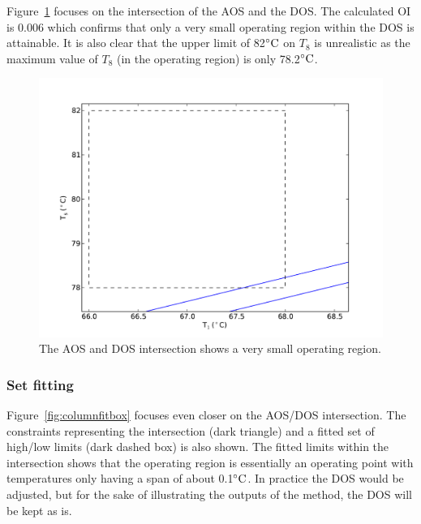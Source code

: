 Figure~\ref{fig:columnaosfocus} focuses on the intersection of the AOS and the DOS.
The calculated OI is 0.006 which confirms that only a very small operating region within the DOS is attainable.
It is also clear that the upper limit of 82$^{\circ}\text{{C}}$ on $T_8$ is unrealistic as the maximum value of $T_8$ (in the operating region) is only 78.2$^{\circ}\text{{C}}$.

\begin{figure}[htbp]
  \centering
    \includegraphics[width=\fullwidth]{graph/columnaosfocus.pdf}
  \caption[AOS and DOS intersection of the laboratory distillation column]{The AOS and DOS intersection shows a very small operating region.}
  \label{fig:columnaosfocus}
\end{figure}

\subsubsection{Set fitting}
Figure~\ref{fig:columnfitbox} focuses even closer on the AOS/DOS intersection.
The constraints representing the intersection (dark triangle) and a fitted set of high/low limits (dark dashed box) is also shown.
The fitted limits within the intersection shows that the operating region is essentially an operating point with temperatures only having a span of about 0.1$^{\circ}\text{{C}}$.
In practice the DOS would be adjusted, but for the sake of illustrating the outputs of the method, the DOS will be kept as is.
  
